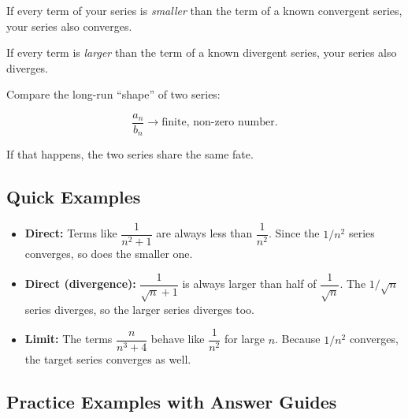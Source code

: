 \documentclass{article}
\begin{document}
\begin{tcolorbox}[colback=gray!8,colframe=black,title=Direct Comparison]
If every term of your series is \emph{smaller} than the term of a
known convergent series, your series also converges.

If every term is \emph{larger} than the term of a known divergent series,
your series also diverges.
\end{tcolorbox}

\begin{tcolorbox}[colback=gray!8,colframe=black,title=Limit Comparison]
Compare the long-run “shape” of two series:

\[
\frac{a_n}{b_n} \longrightarrow \text{finite, non-zero number}.
\]

If that happens, the two series share the same fate.
\end{tcolorbox}

\subsection*{Quick Examples}

\begin{itemize}[itemsep=10pt]

  \item \textbf{Direct:}  
        Terms like \(\dfrac{1}{n^{2}+1}\) are always less than
        \(\dfrac{1}{n^{2}}\).  
        Since the \(1/n^{2}\) series converges, so does the smaller one.

  \item \textbf{Direct (divergence):}  
        \(\dfrac{1}{\sqrt{n}+1}\) is always larger than half of \(\dfrac{1}{\sqrt{n}}\).  
        The \(1/\sqrt{n}\) series diverges, so the larger series diverges too.

  \item \textbf{Limit:}  
        The terms \(\dfrac{n}{n^{3}+4}\) behave like \(\dfrac{1}{n^{2}}\) for large \(n\).  
        Because \(1/n^{2}\) converges, the target series converges as well.

\end{itemize}

\subsection*{Practice Examples with Answer Guides}
\end{document}
